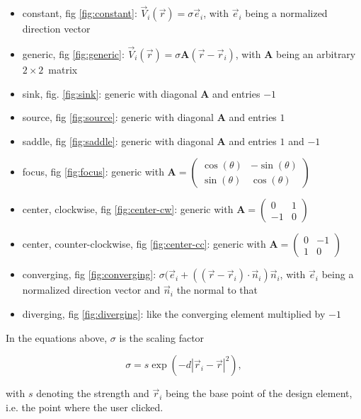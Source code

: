 \documentclass[a4paper,10pt,notitlepage]{scrreprt}
\newcommand{\mat}[1]{\mathbf{#1}}
\begin{document}
\begin{itemize}
 \item constant, fig \ref{fig:constant}: $\vec{V}_i(\vec{r}) = \sigma
\vec{e}_i$, with $\vec{e}_i$ being a normalized direction vector
 \item generic, fig \ref{fig:generic}: $\vec{V}_i(\vec{r}) = \sigma \mat{A}
(\vec{r} - \vec{r}_i) $, with $\mat{A}$ being an arbitrary $2\times2$~matrix
 \item sink, fig. \ref{fig:sink}: generic with diagonal $\mat{A}$ and entries
$-1$
 \item source, fig \ref{fig:source}: generic with diagonal $\mat{A}$ and
entries $1$
 \item saddle, fig \ref{fig:saddle}: generic with diagonal $\mat{A}$ and
entries $1$ and $-1$
 \item focus, fig \ref{fig:focus}: generic with $\mat{A} = \left(
\begin{array}{cc}
\cos(\theta) & -\sin(\theta) \\
\sin(\theta) & \cos(\theta) \end{array} \right)$
 \item center, clockwise, fig \ref{fig:center-cw}: generic with $\mat{A} =
\left(
\begin{array}{cc}
0 & 1 \\
-1 & 0 \end{array} \right)$
 \item center, counter-clockwise, fig \ref{fig:center-cc}: generic with $\mat{A}
= \left(
\begin{array}{cc}
0 & -1 \\
1 & 0 \end{array} \right)$
 \item converging, fig \ref{fig:converging}: $\sigma (\vec{e}_i + ((\vec{r} -
\vec{r}_i) \cdot \vec{n}_i) \vec{n}_i$, with $\vec{e}_i$ being a normalized
direction vector and $\vec{n}_i$ the normal to that
 \item diverging, fig \ref{fig:diverging}: like the converging element
multiplied by $-1$
\end{itemize}

In the equations above, $\sigma$ is the scaling factor

\begin{equation}
 \sigma = s \exp(-d |\vec{r}_i - \vec{r}|^2),
\end{equation}

with $s$ denoting the strength and $\vec{r}_i$ being the base point of the
design element, i.e. the point where the user clicked.
\end{document}
